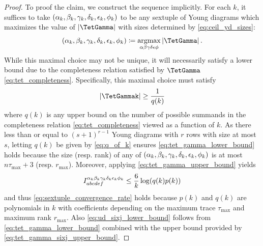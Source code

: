 \documentclass[notitlepage, 10pt]{article}
\begin{document}
\begin{proof}
    To proof the claim, we construct the sequence implicitly. 
    For each $k$, it suffices to take $(\alpha_k, \beta_k, \gamma_k, \delta_k, \epsilon_k, \phi_k)$ to be any sextuple of Young diagrams which maximizes the value of $\abs{\TetGamma}$ with sizes determined by \cref{eq:ceil_yd_sizes}:
    \begin{equation}
        (\ya_k, \yb_k, \yc_k, \yd_k, \ye_k, \yf_k) \coloneqq \underset{\ya\yb\yc\yd\ye\yf}{\argmax} \abs{\TetGamma}.
    \end{equation}
    While this maximal choice may not be unique, it will necessarily satisfy a lower bound due to the completeness relation satisfied by $\TetGamma$ \cref{eq:tet_completeness}.
    Specifically, this maximal choice must satisfy
    \begin{equation}
        \label{eq:tet_gamma_lower_bound}
        \abs{\TetGammak} \geq \frac{1}{q(k)}
    \end{equation}
    where $q(k)$ is any upper bound on the number of possible summands in the completeness relation \cref{eq:tet_completeness} viewed as a function of $k$.
    As there less than or equal to $(s+1)^{r-1}$ Young diagrams with $r$ rows with size at most $s$, letting $q(k)$ be given by \cref{eq:q_of_k} ensures \cref{eq:tet_gamma_lower_bound} holds because the size (resp. rank) of any of $(\alpha_k, \beta_k, \gamma_k, \delta_k, \epsilon_k, \phi_k)$ is at most $n \tau_{\max} + 3$ (resp. $r_{\max}$).
    Moreover, applying \cref{eq:tet_gamma_upper_bound} yields
    \begin{equation}
        I^{\alpha_k\beta_k\gamma_k\delta_k\epsilon_k\phi_k}_{abcdef}
        \leq \frac{6}{k}\log (q(k)p(k))
    \end{equation}
    and thus \cref{eq:sextuple_convergence_rate} holds because $p(k)$ and $q(k)$ are polynomials in $k$ with coefficients depending on the maximum trace $\tau_{\max}$ and maximum rank $r_{\max}$.
    Also \cref{eq:ud_sixj_lower_bound} follows from \cref{eq:tet_gamma_lower_bound} combined with the upper bound provided by \cref{eq:tet_gamma_sixj_upper_bound}.
\end{proof}
\end{document}
